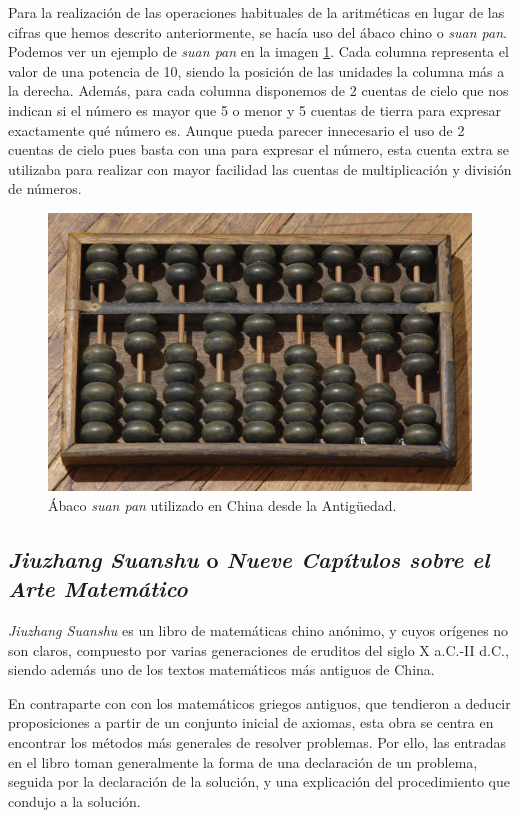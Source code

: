 \documentclass[a4paper, 11pt]{article}
\begin{document}
		Para la realización de las operaciones habituales de la aritméticas en lugar de las cifras que hemos descrito
		anteriormente, se hacía uso del ábaco chino o \textit{suan pan}. Podemos ver un ejemplo de \textit{suan pan} en
		la imagen \ref{fig:ch_abacus}. Cada columna representa el valor de una potencia de 10, siendo la posición
		de las unidades la columna más a la derecha. Además, para cada columna disponemos de 2 cuentas de cielo que nos
		indican si el número es mayor que 5 o menor y 5 cuentas de tierra para expresar exactamente qué número es.
		Aunque pueda parecer innecesario el uso de 2 cuentas de cielo pues basta con una para expresar el número, esta
		cuenta extra se utilizaba para realizar con mayor facilidad las cuentas de multiplicación y división de números.
		
		\begin{figure}[!ht]
			\centering
			\includegraphics[width = 14cm]{Chinese-abacus.jpg}
			\caption{Ábaco \textit{suan pan} utilizado en China desde la Antigüedad.}
			\label{fig:ch_abacus}
		\end{figure}

	\subsection{\textit{Jiuzhang Suanshu} o \textit{Nueve Capítulos sobre el Arte Matemático}}
		\textit{Jiuzhang Suanshu} es un libro de matemáticas chino anónimo, y cuyos orígenes no son claros, compuesto por
		varias generaciones de eruditos del siglo X a.C.-II d.C., siendo además uno de los textos matemáticos más antiguos
		de China.
		
		En contraparte con con los matemáticos griegos antiguos, que tendieron a deducir proposiciones a partir de un
		conjunto inicial de axiomas, esta obra se centra en encontrar los métodos más generales de resolver problemas.
		Por ello, las entradas en el libro toman generalmente la forma de una declaración de un problema, seguida por
		la declaración de la solución, y una explicación del procedimiento que condujo a la solución.
				
\end{document}
